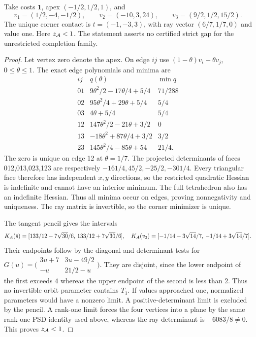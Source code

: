\begin{example}
\label{fd:second-example}
Take costs $\mathbf1$, apex $(-1/2,1/2,1)$, and
\[
 v_1=(1/2,-4,-1/2),\qquad
 v_2=(-10,3,24),\qquad v_3=(9/2,1/2,15/2).
\]
The unique corner contact is $t=(-1,-3,3)$, with
ray vector $(6/7,1/7,0)$ and value one.
Here $z_{\mathcal A}<1$. The statement asserts no certified
strict gap for the unrestricted completion family.
\end{example}
\begin{proof}
Let vertex zero denote the apex. On edge $ij$ use
$(1-\theta)v_i+\theta v_j$, $0\le\theta\le1$.
The exact edge polynomials and minima are
\[
 \begin{array}{c|c|c}
 ij&q(\theta)&\min q\\ \hline
 01&9\theta^2/2-17\theta/4+5/4&71/288\\
 02&95\theta^2/4+29\theta+5/4&5/4\\
 03&4\theta+5/4&5/4\\
 12&147\theta^2/2-21\theta+3/2&0\\
 13&-18\theta^2+87\theta/4+3/2&3/2\\
 23&145\theta^2/4-85\theta+54&21/4 .
 \end{array}
\]
The zero is unique on edge 12 at $\theta=1/7$.
The projected determinants of faces 012,013,023,123
are respectively $-161/4,45/2,-25/2,-301/4$.
Every triangular face therefore has independent
$x,y$ directions, so the restricted quadratic
Hessian is indefinite and cannot have an interior
minimum. The full tetrahedron also has an
indefinite Hessian. Thus all minima occur on
edges, proving nonnegativity and uniqueness.
The ray matrix is invertible, so the corner
minimizer is unique.

The tangent pencil gives the intervals
\[
 K_A(\bar s)=
 [133/12-7\sqrt{30}/6,\,133/12+7\sqrt{30}/6],
 \quad
 K_A(v_3)=
 [-1/14-3\sqrt{14}/7,\,-1/14+3\sqrt{14}/7].
\]
Their endpoints follow by the diagonal and
determinant tests for
$G(u)=\bigl(\begin{smallmatrix}3u+7&3u-49/2\\-u&21/2-u\end{smallmatrix}\bigr)$.
They are disjoint, since the lower endpoint
of the first exceeds $4$ whereas the upper
endpoint of the second is less than $2$.
Thus no invertible orbit parameter contains
$T_1$. If values approached one, normalized
parameters would have a nonzero limit.
A positive-determinant limit is excluded
by the pencil. A rank-one limit forces the
four vertices into a plane by the same
rank-one PSD identity used above, whereas
the ray determinant is $-6083/8\ne0$.
This proves $z_{\mathcal A}<1$.
\end{proof}

